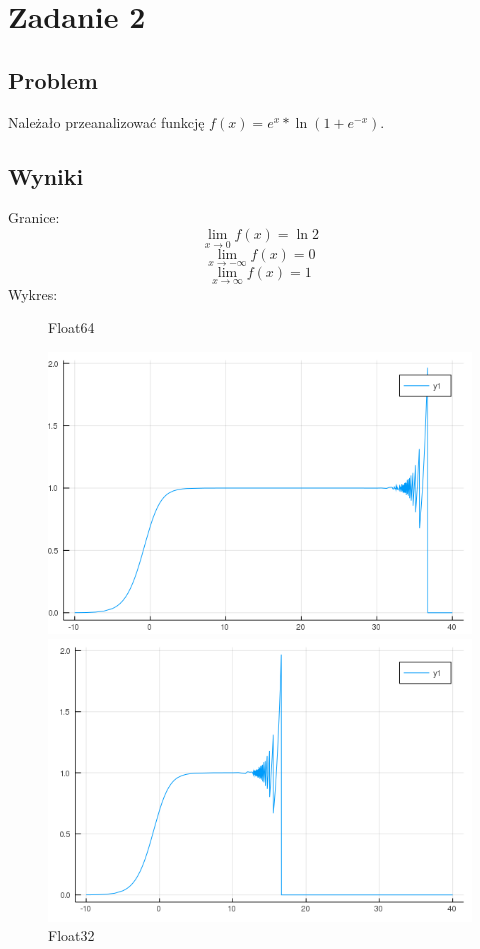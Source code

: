 \documentclass[11pt, a4paper]{article}
\begin{document}
\section{Zadanie 2}
\subsection{Problem}
Należało przeanalizować funkcję $f(x) = e^{x} * \ln{(1 + e^{-x})}$.
\subsection{Wyniki}
Granice:
\[ \lim_{x \to 0} f(x) = \ln{2}\]
\[ \lim_{x \to -\infty} f(x) = 0\]
\[ \lim_{x \to \infty} f(x) = 1\]
Wykres:

\begin{figure}[h]
  \begin{minipage}{0.48\textwidth}
    \centering
    \caption{Float64}
    \includegraphics[width=\linewidth]{plot-jl}
  \end{minipage}
  \begin{minipage}{0.48\textwidth}
    \centering
    \caption{Float32}
    \includegraphics[width=\linewidth]{plot-jl32}
  \end{minipage}
\end{figure}
\end{document}
